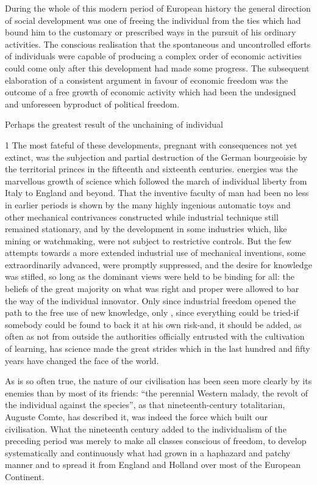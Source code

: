\documentclass[11pt,openany]{book}
\begin{document}
During the whole of this modern period of European history the general direction of social development was one of freeing the individual from the ties which had bound him to the customary or prescribed ways in the pursuit of his ordinary activities. The conscious realisation that the spontaneous and uncontrolled efforts of individuals were capable of producing a complex order of economic activities could come only after this development had made some progress. The subsequent elaboration of a consistent argument in favour of economic freedom was the outcome of a free growth of economic activity which had been the undesigned and unforeseen byproduct of political freedom.

Perhaps the greatest result of the unchaining of individual

1 The most fateful of these developments, pregnant with consequences not yet extinct, was the subjection and partial destruction of the German bourgeoisie by the territorial princes in the fifteenth and sixteenth centuries. energies was the marvellous growth of science which followed the march of individual liberty from Italy to England and beyond. That the inventive faculty of man had been no less in earlier periods is shown by the many highly ingenious automatic toys and other mechanical contrivances constructed while industrial technique still remained stationary, and by the development in some industries which, like mining or watchmaking, were not subject to restrictive controls. But the few attempts towards a more extended industrial use of mechanical inventions, some extraordinarily advanced, were promptly suppressed, and the desire for knowledge was stifled, so long as the dominant views were held to be binding for all: the beliefs of the great majority on what was right and proper were allowed to bar the way of the individual innovator. Only since industrial freedom opened the path to the free use of new knowledge, only , since everything could be tried-if somebody could be found to back it at his own risk-and, it should be added, as often as not from outside the authorities officially entrusted with the cultivation of learning, has science made the great strides which in the last hundred and fifty years have changed the face of the world.

As is so often true, the nature of our civilisation has been seen more clearly by its enemies than by most of its friends: ``the perennial Western malady, the revolt of the individual against the species'', as that nineteenth-century totalitarian, Auguste Comte, has described it, was indeed the force which built our civilisation. What the nineteenth century added to the individualism of the preceding period was merely to make all classes conscious of freedom, to develop systematically and continuously what had grown in a haphazard and patchy manner and to spread it from England and Holland over most of the European Continent.
\end{document}
